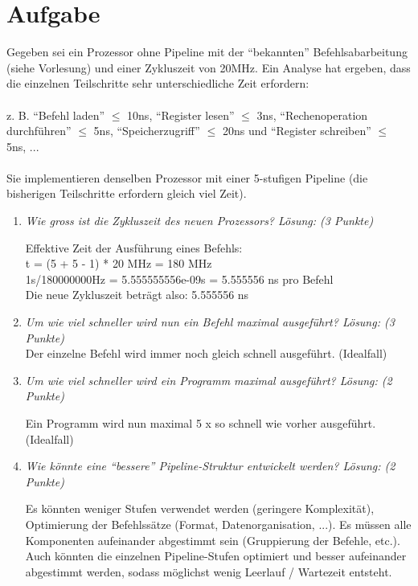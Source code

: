 \documentclass[10pt]{article}
\begin{document}
\section{Aufgabe}
Gegeben sei ein Prozessor ohne Pipeline mit der "`bekannten"' Befehlsabarbeitung (siehe Vorlesung) und einer Zykluszeit von 20MHz. Ein Analyse hat ergeben, dass die einzelnen Teilschritte sehr unterschiedliche Zeit erfordern:\\\\
z. B. "`Befehl laden"' $\leq$ 10ns, "`Register lesen"' $\leq$ 3ns, "`Rechenoperation durchführen"' $\leq$ 5ns, "`Speicherzugriff"' $\leq$ 20ns und "`Register schreiben"' $\leq$ 5ns, ... \\\\
Sie implementieren denselben Prozessor mit einer 5-stufigen Pipeline (die bisherigen Teilschritte erfordern gleich viel Zeit). 
\begin{enumerate}[label=\alph*)]
	\item 
	\textit{Wie gross ist die Zykluszeit des neuen Prozessors? Lösung: (3 Punkte) } 
	
	Effektive Zeit der Ausführung eines Befehls:\\
	t = (5 + 5 - 1) * 20 MHz = 180 MHz\\
	1s/180000000Hz = 5.555555556e-09s = 5.555556 ns pro Befehl\\
	
	Die neue Zykluszeit beträgt also: 5.555556 ns
	

	\item 
	\textit{Um wie viel schneller wird nun ein Befehl maximal ausgeführt? Lösung: (3 Punkte)} \\
	Der einzelne Befehl wird immer noch gleich schnell ausgeführt. (Idealfall)	
	\item 
	\textit{Um wie viel schneller wird ein Programm maximal ausgeführt? Lösung: (2 Punkte) }
	
	Ein Programm wird nun maximal 5 x so schnell wie vorher ausgeführt. (Idealfall)
	\item 
	\textit{Wie	könnte eine "`bessere"' Pipeline-Struktur entwickelt werden? Lösung: (2 Punkte)  } 
	
	Es könnten weniger Stufen verwendet werden (geringere Komplexität), Optimierung der Befehlssätze (Format, Datenorganisation, ...). Es müssen alle Komponenten aufeinander abgestimmt sein (Gruppierung der Befehle, etc.). Auch könnten die einzelnen Pipeline-Stufen optimiert und besser aufeinander abgestimmt werden, sodass möglichst wenig Leerlauf / Wartezeit entsteht.	
\end{enumerate}
\end{document}
